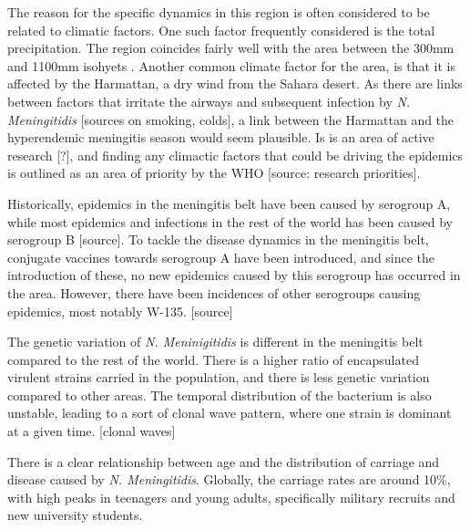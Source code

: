 \documentclass[10pt,a4paper]{article}
\begin{document}
The reason for the specific dynamics in this region is often considered to be related to climatic factors. One such factor frequently considered is the total precipitation. The region coincides fairly well with the area between the 300mm and 1100mm isohyets \cite{molesworth2002meningitis}. Another common climate factor for the area, is that it is affected by the Harmattan, a dry wind from the Sahara desert. As there are links between factors that irritate the airways and subsequent infection by \emph{N. Meningitidis} [sources on smoking, colds], a link between the Harmattan and the hyperendemic meningitis season would seem plausible. Is is an area of active research [?], and finding any climactic factors that could be driving the epidemics is outlined as an area of priority by the WHO [source: research priorities].

Historically, epidemics in the meningitis belt have been caused by serogroup A, while most epidemics and infections in the rest of the world has been caused by serogroup B [source]. To tackle the disease dynamics in the meningitis belt, conjugate vaccines towards serogroup A have been introduced, and since the introduction of these, no new epidemics caused by this serogroup has occurred in the area. However, there have been incidences of other serogroups causing epidemics, most notably W-135. [source]

The genetic variation of \emph{N. Meninigitidis} is different in the meningitis belt compared to the rest of the world. There is a higher ratio of encapsulated virulent strains carried in the population, and there is less genetic variation compared to other areas. The temporal distribution of the bacterium is also unstable, leading to a sort of clonal wave pattern, where one strain is dominant at a given time. [clonal waves]

There is a clear relationship between age and the distribution of carriage and disease caused by \emph{N. Meningitidis}. Globally, the carriage rates are around 10\%, with high peaks in teenagers and young adults, specifically military recruits and new university students. %




\end{document}
